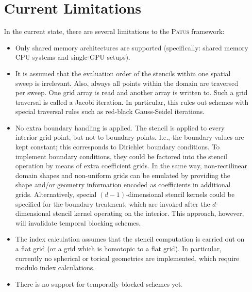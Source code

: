 \chapter{Current Limitations}

In the current state, there are several limitations to the \textsc{Patus} framework:
\begin{itemize}
	\item Only shared memory architectures are supported (specifically: shared memory CPU systems and single-GPU setups).
	\item It is assumed that the evaluation order of the stencils within one spatial sweep is irrelevant.
		Also, always all points within the domain are traversed per sweep. One grid array is read and another
		array is written to. Such a grid traversal is called a Jacobi iteration.
		In particular, this rules out schemes with special traversal rules such as red-black Gauss-Seidel
		iterations.
	\item No extra boundary handling is applied. The stencil is applied to every interior grid point, but not to boundary
		points. I.e., the boundary values are kept constant; this corresponds to Dirichlet boundary conditions.
		To implement boundary conditions, they could be factored into the stencil operation by means of extra coefficient grids.
		In the same way, non-rectilinear domain shapes and non-uniform grids can be emulated by providing the shape and/or
		geometry information encoded as coefficients in additional grids.
		Alternatively, special $(d-1)$-dimensional stencil kernels could be specified for the boundary treatment,
		which are invoked after the $d$-dimensional stencil kernel operating on the interior. This approach, however,
		will invalidate temporal blocking schemes.
	\item The index calculation assumes that the stencil computation is carried out on a flat grid (or a grid which is
		homotopic to a flat grid). In particular, currently no spherical or torical geometries are implemented, which require
		modulo index calculations.
	\item There is no support for temporally blocked schemes yet.
\end{itemize}

